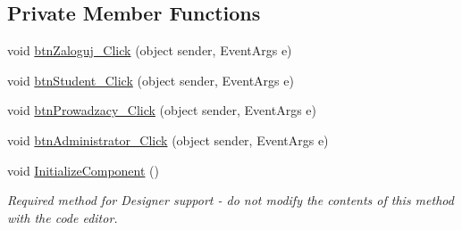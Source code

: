 \subsection*{Private Member Functions}
\begin{DoxyCompactItemize}
\item 
void \hyperlink{class_dziennik_ocen_1_1_form1_a28adc07ca2d4d960f57b60cae2b1bad9}{btn\+Zaloguj\+\_\+\+Click} (object sender, Event\+Args e)
\item 
void \hyperlink{class_dziennik_ocen_1_1_form1_acb939aa086bb943e9720d95d9142ef88}{btn\+Student\+\_\+\+Click} (object sender, Event\+Args e)
\item 
void \hyperlink{class_dziennik_ocen_1_1_form1_a0b2d561130044c417c0c5d0e7d4172b9}{btn\+Prowadzacy\+\_\+\+Click} (object sender, Event\+Args e)
\item 
void \hyperlink{class_dziennik_ocen_1_1_form1_a600f65aebd5840bfccaf74538a7259a0}{btn\+Administrator\+\_\+\+Click} (object sender, Event\+Args e)
\item 
void \hyperlink{class_dziennik_ocen_1_1_form1_a25d1f1865febb87fc9186127ca72793c}{Initialize\+Component} ()
\begin{DoxyCompactList}\small\item\em Required method for Designer support -\/ do not modify the contents of this method with the code editor. \end{DoxyCompactList}\end{DoxyCompactItemize}
